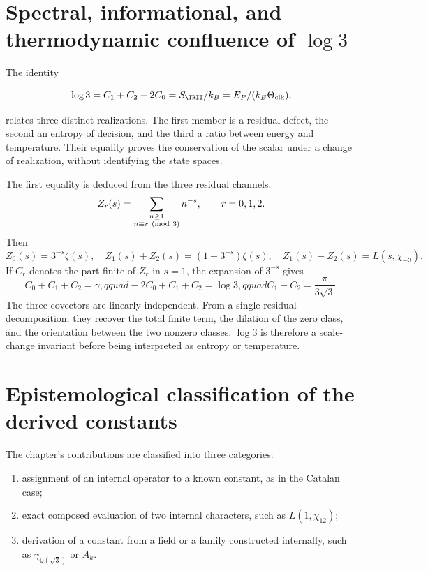 \section{Spectral, informational, and thermodynamic confluence of \(\log3\)}

The identity

\[
\log3=C_1+C_2-2C_0
=S_{\TRIT}/k_B
=E_P/(k_B\Theta_{\rm clk}),
\]

relates three distinct realizations. The first member is a residual
defect, the second an entropy of decision, and the third a ratio
between energy and temperature. Their equality proves the conservation of the
scalar under a change of realization, without identifying the state
spaces.

The first equality is deduced from the three residual channels.
\[
Z_r(s)=\sum_{\substack{n\ge1\\n\equiv r\ ({\rm mod}\ 3)}}n^{-s},
\qquad r=0,1,2.
\]
Then
\[
Z_0(s)=3^{-s}\zeta(s),\quad
Z_1(s)+Z_2(s)=(1-3^{-s})\zeta(s),\quad
Z_1(s)-Z_2(s)=L(s,\chi_{-3}).
\]
If \(C_r\) denotes the part finite of \(Z_r\) in \(s=1\), the expansion
of \(3^{-s}\) gives
\begin{equation}
C_0+C_1+C_2=\gamma,qquad
-2C_0+C_1+C_2=\log3,qquad
C_1-C_2=\frac{\pi}{3\sqrt3}.
\label{eq:residual-three-covectors}
\end{equation}
The three covectors are linearly independent. From a single residual
decomposition, they recover the total finite term, the dilation of the
zero class, and the orientation between the two nonzero classes. \(\log3\) is
therefore a scale-change invariant before being interpreted as
entropy or temperature.

\section{Epistemological classification of the derived constants}

The chapter's contributions are classified into three categories:

\begin{enumerate}
\item assignment of an internal operator to a known constant, as in
the Catalan case;
\item exact composed evaluation of two internal characters, such as
\(L(1,\chi_{12})\);
\item derivation of a constant from a field or a family
constructed internally, such as \(\gamma_{\mathbb Q(\sqrt3)}\) or \(A_k\).
\end{enumerate}

